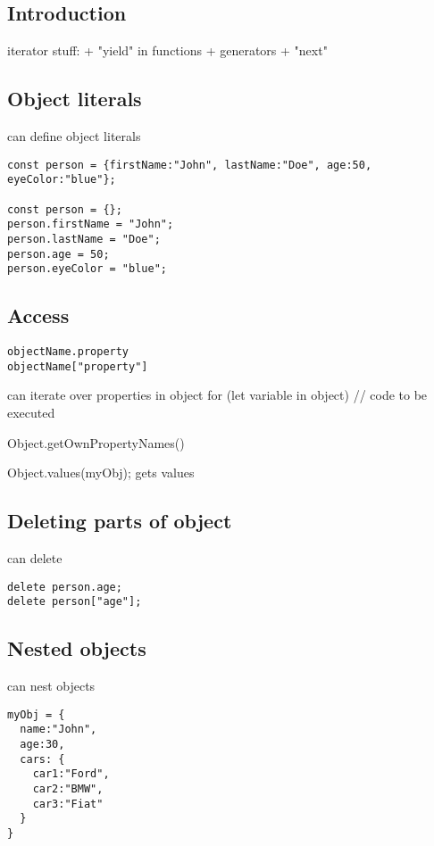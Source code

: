 
\subsection{Introduction}


iterator stuff:
+ "yield" in functions
+ generators
+ "next"

\subsection{Object literals}

can define object literals

\begin{verbatim}
const person = {firstName:"John", lastName:"Doe", age:50, eyeColor:"blue"};

const person = {};
person.firstName = "John";
person.lastName = "Doe";
person.age = 50;
person.eyeColor = "blue";
\end{verbatim}

\subsection{Access}

\begin{verbatim}
objectName.property
objectName["property"]
\end{verbatim}


can iterate over properties in object
for (let variable in object) {
  // code to be executed
}

Object.getOwnPropertyNames()

Object.values(myObj); gets values

\subsection{Deleting parts of object}

can delete
\begin{verbatim}
delete person.age;
delete person["age"];
\end{verbatim}

\subsection{Nested objects}

can nest objects
\begin{verbatim}
myObj = {
  name:"John",
  age:30,
  cars: {
    car1:"Ford",
    car2:"BMW",
    car3:"Fiat"
  }
}
\end{verbatim}

